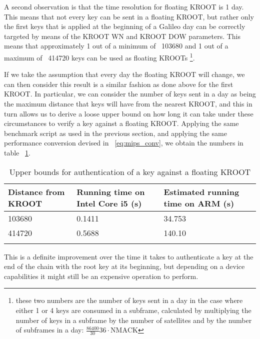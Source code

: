 A second observation is that the time resolution for floating KROOT is 1
day. This means that not every key can be sent in a floating KROOT, but rather
only the first keys that is applied at the beginning of a Galileo day can be
correctly targeted by means of the KROOT WN and KROOT DOW parameters. This means
that approximately 1 out of a minimum of ~103680 and 1 out of a maximum of
~414720 keys can be used as floating KROOTs \footnote{these two numbers are the number of
keys sent in a day in the case where either 1 or 4 keys are consumed in a
subframe, calculated by multiplying the number of keys in a subframe by the
number of satellites and by the number of subframes in a day:
$\frac{86400}{30}36 \cdot \textrm{NMACK}$}.

If we take the assumption that every day the floating KROOT will change, we can
then consider this result is a similar fashion as done above for the first
KROOT. In particular, we can consider the number of keys sent in a day as being
the maximum distance that keys will have from the nearest KROOT, and this in
turn allows us to derive a loose upper bound on how long it can take under these
circumstances to verify a key against a floating KROOT. Applying the same
benchmark script as used in the previous section, and applying the same
performance conversion devised in ~\ref{eq:mips_conv}, we obtain the numbers in
table ~\ref{table:float_kroot}.

\begin{longtable}[]{@{}lll@{}}
\toprule
  Distance from KROOT & Running time on Intel Core i5 (s) & Estimated running
  time on ARM (s) \tabularnewline
\midrule
\endhead
  103680 & 0.1411 & 34.753 \tabularnewline
  414720 & 0.5688 & 140.10 \tabularnewline
\bottomrule
  \caption{Upper bounds for authentication of a key against a floating KROOT}
\label{table:float_kroot}
\end{longtable}

This is a definite improvement over the time it takes to authenticate a key at
the end of the chain with the root key at its beginning, but depending on a
device capabilities it might still be an expensive operation to perform.


